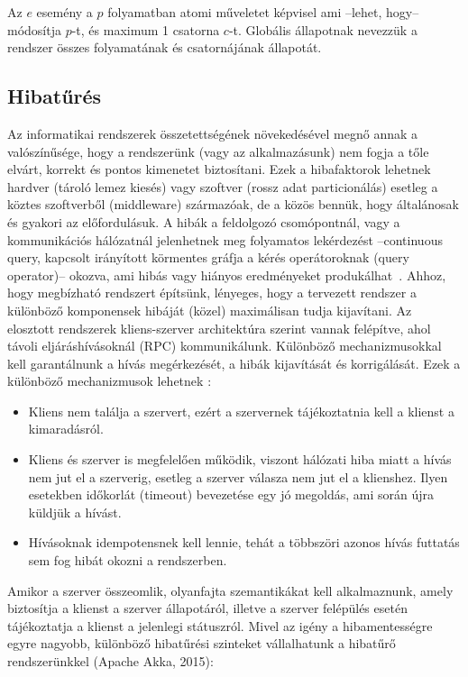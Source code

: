 \documentclass[a4paper,12pt]{article}
\begin{document}
Az $e$ esemény a $p$ folyamatban atomi műveletet képvisel ami --lehet, hogy-- módosítja $p$-t, és maximum 1 csatorna $c$-t. Globális állapotnak nevezzük a rendszer összes folyamatának és csatornájának állapotát. \newline


\subsection{Hibatűrés}

Az informatikai rendszerek összetettségének növekedésével megnő annak a valószínűsége, hogy a rendszerünk (vagy az alkalmazásunk) nem fogja a tőle elvárt, korrekt és pontos kimenetet biztosítani. Ezek a hibafaktorok lehetnek hardver (tároló lemez kiesés) vagy szoftver (rossz adat particionálás) esetleg a köztes szoftverből (middleware) származóak, de a közös bennük, hogy általánosak és gyakori az előfordulásuk.  A hibák a feldolgozó csomópontnál, vagy a kommunikációs hálózatnál jelenhetnek meg folyamatos lekérdezést --continuous query, kapcsolt irányított körmentes gráfja a kérés operátoroknak (query operator)-- okozva, ami hibás vagy hiányos eredményeket produkálhat~\cite{balazinska}. Ahhoz, hogy megbízható rendszert építsünk, lényeges, hogy a tervezett rendszer a különböző komponensek hibáját (közel) maximálisan tudja kijavítani. Az elosztott rendszerek kliens-szerver architektúra szerint vannak felépítve, ahol távoli eljáráshívásoknál (RPC) kommunikálunk. Különböző mechanizmusokkal kell garantálnunk a hívás megérkezését, a hibák kijavítását és korrigálását. Ezek a különböző mechanizmusok lehetnek \cite{szemantika}:

\begin{itemize}
\item Kliens nem találja a szervert, ezért a szervernek tájékoztatnia kell a klienst a kimaradásról.
\item Kliens és szerver is megfelelően működik, viszont hálózati hiba miatt a hívás nem jut el a szerverig, esetleg a szerver válasza nem jut el a klienshez. Ilyen esetekben időkorlát (timeout) bevezetése egy jó megoldás, ami során újra küldjük a hívást.
\item Hívásoknak idempotensnek kell lennie, tehát a többszöri azonos hívás futtatás sem fog hibát okozni a rendszerben.
\end{itemize}

Amikor a szerver összeomlik, olyanfajta szemantikákat kell alkalmaznunk, amely biztosítja a klienst a szerver állapotáról, illetve a szerver felépülés esetén tájékoztatja a klienst a jelenlegi státuszról. \newline
Mivel az igény a hibamentességre egyre nagyobb, különböző hibatűrési szinteket vállalhatunk a hibatűrő rendszerünkkel (Apache Akka, 2015):
\end{document}
